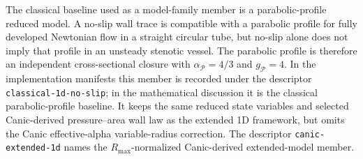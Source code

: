 \begin{definition}
    \label{def:classical-no-slip-1d-baseline}
    The classical baseline used as a model-family member is a
    parabolic-profile reduced model. A no-slip wall trace is compatible with a
    parabolic profile for fully developed Newtonian flow in a straight circular
    tube, but no-slip alone does not imply that profile in an unsteady stenotic
    vessel. The parabolic profile is therefore an independent cross-sectional
    closure with $\alpha_{\mathcal P}=4/3$ and $g_{\mathcal P}=4$. In the
    implementation manifests this member is recorded under the descriptor
    \texttt{classical-1d-no-slip}; in the mathematical discussion it is
    the classical parabolic-profile baseline. It keeps the same reduced state
    variables and selected Canic-derived pressure--area wall law as the
    extended 1D framework, but omits the Canic effective-alpha variable-radius
    correction. The descriptor \texttt{canic-extended-1d} names the
    $R_{\max}$-normalized Canic-derived extended-model member.
\end{definition}

